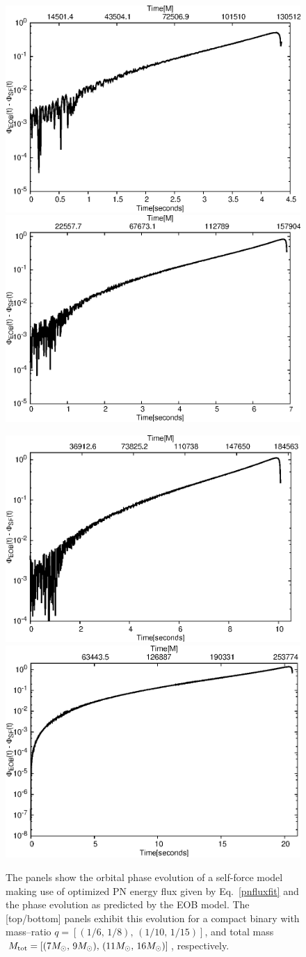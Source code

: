  \begin{figure}%
\centerline{
\includegraphics[height=0.4\textwidth,  clip]{figures/imrimri/phsiffeobsfm1m6.eps}
\includegraphics[height=0.4\textwidth,  clip]{figures/imrimri/phsiffeobsfm1m8.eps}
}
\centerline{
\includegraphics[height=0.4\textwidth,  clip]{figures/imrimri/phsiffeobsfm1m10.eps}
\includegraphics[height=0.4\textwidth,  clip]{figures/imrimri/phsiffeobsfm1m15.eps}
}
\caption{The panels show the orbital phase evolution of a self-force model making use of optimized PN energy flux given by Eq.~\eqref{pnfluxfit} and the phase evolution as predicted by the EOB model. The [top/bottom] panels exhibit this evolution for a compact binary with mass--ratio \(q=[(1/6,\,1/8), \,( 1/10,\,1/15)]\), and total mass \(M_{{\rm{tot}}}=[ (7M_{\odot} ,\, 9M_{\odot} ), \, ( 11M_{\odot},\, 16M_{\odot})  ]\), respectively. }
\label{PNoptimized}
\end{figure}

